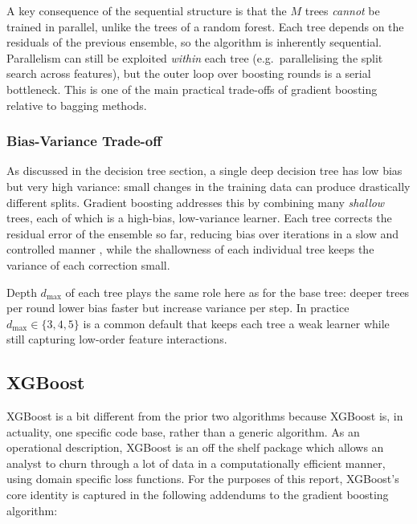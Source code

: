 \documentclass[a4paper, 11pt]{article}
\begin{document}
A key consequence of the sequential structure is that the $M$ trees
\emph{cannot} be trained in parallel, unlike the trees of a random
forest. Each tree depends on the residuals of the previous ensemble,
so the algorithm is inherently sequential. Parallelism can still be
exploited \emph{within} each tree (e.g.\ parallelising the split
search across features), but the outer loop over boosting rounds is
a serial bottleneck. This is one of the main practical trade-offs
of gradient boosting relative to bagging methods.

\subsubsection{Bias-Variance Trade-off}

As discussed in the decision tree section, a single deep decision
tree has low bias but very high variance: small changes in the
training data can produce drastically different
splits. Gradient boosting addresses this by combining many
\emph{shallow} trees, each of which is a high-bias, low-variance
learner. Each tree corrects the residual error of the ensemble so
far, reducing bias over iterations in a slow and controlled manner ,
while the shallowness of each individual tree keeps the variance of
each correction small.

Depth $d_{\max}$ of each tree plays the same role here as for the base tree:
deeper trees per round lower bias faster but increase variance per
step. In practice $d_{\max} \in \{3,4,5\}$ is a common default that
keeps each tree a weak learner while still capturing low-order
feature interactions.

\subsection{XGBoost}

XGBoost is a bit different from the prior two algorithms because XGBoost is,
in actuality, one specific code base, rather than a generic
algorithm. As an operational description, XGBoost is an off the shelf
package which allows an analyst to churn through a lot of data in a
computationally efficient manner, using domain specific loss
functions. For the purposes of this report, XGBoost's core identity
is captured in the following addendums to the gradient boosting algorithm:
\end{document}
